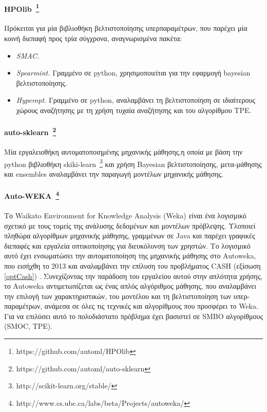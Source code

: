  \paragraph[HPOlib]{HPOlib~\footnote{https://github.com/automl/HPOlib} }  Πρόκειται για μία βιβλιοθήκη βελτιστοποίησης υπερπαραμέτρων, που παρέχει μία κοινή διεπαφή προς τρία σύγχρονα, αναγνωρισμένα πακέτα: 
 \begin{itemize}
 	\item \textit{ SMAC.}
 	\item \textit{ Spearmint.} Γραμμένο σε python, χρησιμοποιείται για την εφαρμογή bayesian βελτιστοποίησης.
 	\item \textit{ Hyperopt.} Γραμμένο σε python, αναλαμβάνει τη βελτιστοποίηση σε ιδιαίτερους χώρους αναζήτησης με τη χρήση τυχαία αναζήτησης και του αλγορίθμου TPE.
 \end{itemize}
 
 \paragraph[auto-sklearn]{auto-sklearn~\footnote{https://github.com/automl/auto-sklearn} } Μία εργαλειοθήκη αυτοματοποιημένης μηχανικής μάθησης,η οποία με βάση την python βιβλιοθήκη skiki-learn~\footnote{http://scikit-learn.org/stable/} και χρήση Bayesian βελτιστοποίησης, μετα-μάθησης και ensembles αναλαμβάνει την παραγωγή μοντέλων μηχανικής μάθησης.
 
    
 \paragraph[Auto-WEKA]{Auto-WEKA~\footnote{http://www.cs.ubc.ca/labs/beta/Projects/autoweka/} }  Το Waikato Environment for Knowledge Analysis (Weka) είναι ένα λογισμικό σχετικό με τους τομείς της ανάλυσης δεδομένων και μοντέλων πρόβλεψης. Υλοποιεί πληθώρα αλγορίθμων μηχανικής μάθησης, γραμμένων σε Java και παρέχει γραφικές διεπαφές και εργαλεία οπτικοποίησης για διευκόλυνση των χρηστών. Το λογισμικό αυτό έχει ενσωματώσει την αυτοματοποίηση της μηχανικής μάθησης στο Autoweka, που εισήχθη το 2013 και αναλαμβάνει την επίλυση του προβλήματος  CASH (εξίσωση \ref{optCash}) . Συνεχίζοντας την παράδοση του εργαλείου αυτού στην απλότητα χρήσης, το Autoweka αντιμετωπίζεται ως ένας απλός αλγόριθμος μάθησης, που αναλαμβάνει την επιλογή των χαρακτηριστικών, του μοντέλου και  τη βελτιστοποίηση των υπερ-παραμέτρων, ανάμεσα σε όλες τις τεχνικές και αλγορίθμους που προσφέρει το Weka. Για να επιλύσει αυτό το πολυδιάστατο πρόβλημα έχει βασιστεί σε SMBO αλγορίθμους (SMOC, TPE).  
